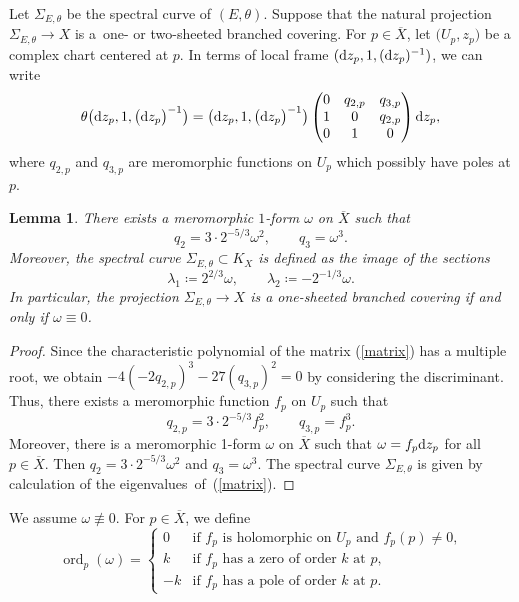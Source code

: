 \documentclass[10pt,a4paper]{amsart}
\numberwithin{equation}{section}
\newtheorem{Lemma}[Theorem]{Lemma}
\newcommand{\ord}{\operatorname{ord}}
\begin{document}
Let $\Sigma_{E,\theta}$ be the spectral curve of $(E,\theta)$. Suppose that the natural projection $\Sigma_{E,\theta}\to X$ is a~one- or two-sheeted branched covering.
For $p\in\overline{X}$, let $\bigl(U_p,z_p\bigr)$ be a complex chart centered at $p$. In terms of local frame $({\rm d}z_p,1,({\rm d}z_p)^{-1})$, we can write
\begin{equation}\label{matrix}
 \theta \bigl({\rm d}z_p,1,\bigl({\rm d}z_p\bigr)^{-1}\bigr) = \bigl({\rm d}z_p,1,\bigl({\rm d}z_p\bigr)^{-1}\bigr) \begin{pmatrix}
 0 & q_{2,p} & q_{3,p}\\
 1 & 0 & q_{2,p} \\
 0 & 1 & 0
 \end{pmatrix} {\rm d}z_p,
\end{equation}
where $q_{2,p}$ and $q_{3,p}$ are meromorphic functions on $U_p$ which possibly have poles at $p$.
\begin{Lemma}\label{meromorphic_form}
 There exists a meromorphic $1$-form $\omega$ on $\overline{X}$ such that
 \begin{equation*}%
 q_2=3\cdot 2^{-5/3}\omega^2,\qquad q_3=\omega^3.
 \end{equation*}
 Moreover, the spectral curve $\Sigma_{E,\theta}\subset K_X$ is defined as the image of the sections
 \begin{equation*}%
 \lambda_1\coloneqq2^{2/3}\omega,\qquad\lambda_2\coloneqq -2^{-1/3}\omega.
 \end{equation*}
 In particular, the projection $\Sigma_{E,\theta}\to X$ is a one-sheeted branched covering if and only if $\omega\equiv 0$.
\end{Lemma}
\begin{proof}
 Since the characteristic polynomial of the matrix (\ref{matrix}) has a multiple root, we obtain $-4(-2q_{2,p})^3-27(q_{3,p})^2=0$ by considering the discriminant. Thus, there exists a meromorphic function $f_p$ on $U_p$ such that
 \begin{equation*}
 q_{2,p}=3\cdot 2^{-5/3}f_p^2,\qquad q_{3,p}=f_p^3.
 \end{equation*}
 Moreover, there is a meromorphic 1-form $\omega$ on $\overline{X}$ such that $\omega=f_p {\rm d}z_p$ for all $p\in \overline{X}$. Then ${q_2=3\cdot 2^{-5/3}\omega^2}$ and $q_3=\omega^3$. The spectral curve $\Sigma_{E,\theta}$ is given by calculation of the eigenvalues~of~(\ref{matrix}).
\end{proof}

We assume $\omega \not\equiv 0$.
For $p\in \overline{X}$, we define
\begin{equation*}
 \ord_p(\omega) = \begin{cases}
 0 & \text{if $f_p$ is holomorphic on $U_p$ and $f_p(p)\neq 0$,} \\
 k & \text{if $f_p$ has a zero of order $k$ at $p$,} \\
 -k & \text{if $f_p$ has a pole of order $k$ at $p$.}
 \end{cases}
\end{equation*}
\end{document}
